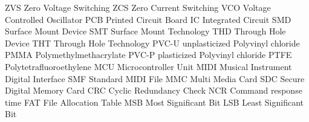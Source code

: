    {ZVS}    {Zero Voltage Switching}
   {ZCS}    {Zero Current Switching}
   {VCO}    {Voltage Controlled Oscillator}
   {PCB}    {Printed Circuit Board}
    {IC}     {Integrated Circuit}
   {SMD}    {Surface Mount Device}
   {SMT}    {Surface Mount Technology}
   {THD}    {Through Hole Device}
   {THT}    {Through Hole Technology}
  {PVC-U}  {unplasticized Polyvinyl chloride}
  {PMMA}   {Polymethylmethacrylate}
  {PVC-P}  {plasticized Polyvinyl chloride}
  {PTFE}   {Polytetrafluoroethylene}
   {MCU}    {Microcontroller Unit}
  {MIDI}   {Musical Instrument Digital Interface}
   {SMF}    {Standard MIDI File}
   {MMC}    {Multi Media Card}
   {SDC}    {Secure Digital Memory Card}
   {CRC}    {Cyclic Redundancy Check}
   {NCR}    {Command response time}
   {FAT}    {File Allocation Table}
   {MSB}    {Most Significant Bit}
   {LSB}    {Least Significant Bit}